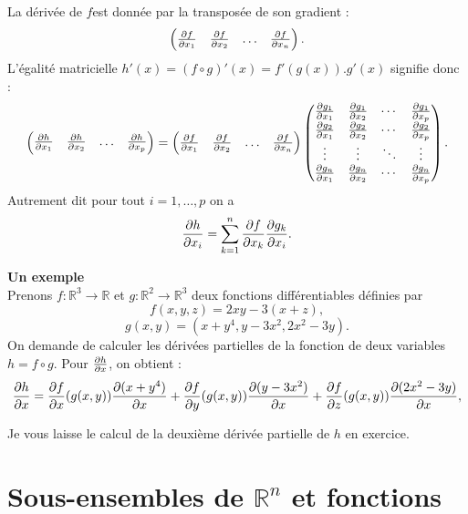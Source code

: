 \documentclass[class=report,crop=false]{standalone}
\begin{document}
{{{{{{La dérivée de $f$est donnée par la transposée de son gradient :
$$
\begin{pmatrix} {{\partial f}\over{\partial x_1}}& {{\partial f}\over{\partial x_2}}&\ldots&{{\partial f}\over{\partial x_n}}\end{pmatrix}.
$$
L'égalité matricielle $h'(x)=(f\circ g)'(x)=f'(g(x)).g'(x)$ signifie donc :
$$
\begin{pmatrix} {{\partial h}\over{\partial x_1}}&{{\partial h}\over{\partial x_2}}&\ldots& {{\partial h}\over{\partial x_p}}\end{pmatrix}= \begin{pmatrix} {{\partial f}\over{\partial x_1}}& {{\partial f}\over{\partial x_2}}&\ldots&{{\partial f}\over{\partial x_n}}
\end{pmatrix}
\begin{pmatrix} 
{{\partial g_1}\over{\partial x_1}} & {{\partial g_1}\over{\partial x_2}} &\cdots&{{\partial g_1}\over{\partial x_p}}\cr {{\partial g_2}\over{\partial x_1}} & {{\partial g_2}\over{\partial x_2}} &\cdots&{{\partial g_2}\over{\partial x_p}}\cr \vdots&\vdots&\ddots&\vdots\cr{{\partial g_n}\over{\partial x_1}} & {{\partial g_n}\over{\partial x_2}} &\cdots&{{\partial g_n}\over{\partial x_p}}\cr
\end{pmatrix}.
$$
Autrement dit pour tout $i=1,\ldots, p$ on a
$$
{{\partial h}\over{\partial x_i}}=\sum_{k=1}^n{{\partial f}\over{\partial x_k}}{{\partial g_k}\over{\partial x_i}}.
$$


{\bf Un exemple}\\
Prenons $f:\mathbb{R}^3\rightarrow \mathbb{R}$ et  $g:\mathbb{R}^2\rightarrow \mathbb{R}^3$ deux fonctions différentiables définies par
$$
f(x,y,z)=2xy-3(x+z),
$$
$$
g(x,y)=(x+y^4, y-3x^2,2x^2-3y).
$$
On demande de calculer les dérivées partielles de la fonction de deux variables $h=f\circ g$. 
Pour ${{\partial h}\over{\partial x}}$, on obtient :
$$
{{\partial h}\over{\partial x}}={{\partial f}\over{\partial x}}{(g(x,y))}{{\partial(x+y^4)}\over{\partial x}}+{{\partial f}\over{\partial y}}{(g(x,y))}{{\partial (y-3x^2)}\over{\partial x}}+{{\partial f}\over{\partial z}}{(g(x,y))}{{\partial (2x^2-3y)}\over{\partial x}},
$$

Je vous laisse le calcul de la deuxi\`eme dérivée partielle de $h$ en exercice.\\


\newpage
\section{ Sous-ensembles de $\mathbb{R}^n$ et fonctions}

}}}}}}
\end{document}
